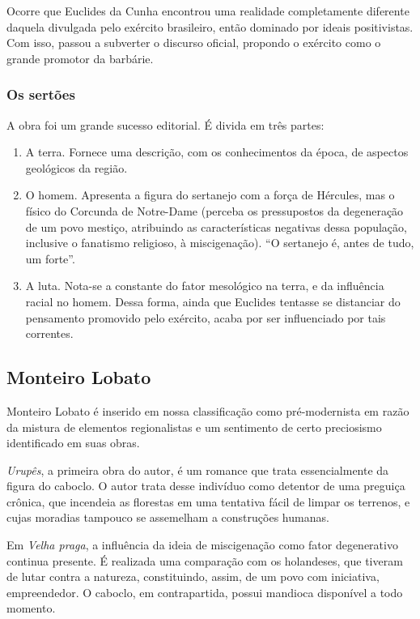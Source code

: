 Ocorre que Euclides da Cunha encontrou uma realidade completamente diferente daquela divulgada pelo exército brasileiro, então dominado por ideais positivistas. Com isso, passou a subverter o discurso oficial, propondo o exército como o grande promotor da barbárie.

\subsubsection{Os sertões}

A obra foi um grande sucesso editorial. É divida em três partes:

\begin{enumerate}
    \item A terra. Fornece uma descrição, com os conhecimentos da época, de aspectos geológicos da região.
    \item O homem. Apresenta a figura do sertanejo com a força de Hércules, mas o físico do Corcunda de Notre-Dame (perceba os pressupostos da degeneração de um povo mestiço, atribuindo as características negativas dessa população, inclusive o fanatismo religioso, à miscigenação). ``O sertanejo é, antes de tudo, um forte''.
    \item A luta. Nota-se a constante do fator mesológico na terra, e da influência racial no homem. Dessa forma, ainda que Euclides tentasse se distanciar do pensamento promovido pelo exército, acaba por ser influenciado por tais correntes.
\end{enumerate}

\subsection{Monteiro Lobato}

Monteiro Lobato é inserido em nossa classificação como pré-modernista em razão da mistura de elementos regionalistas e um sentimento de certo preciosismo identificado em suas obras.

\textit{Urupês}, a primeira obra do autor, é um romance que trata essencialmente da figura do caboclo. O autor trata desse indivíduo como detentor de uma preguiça crônica, que incendeia as florestas em uma tentativa fácil de limpar os terrenos, e cujas moradias tampouco se assemelham a construções humanas.

Em \textit{Velha praga}, a influência da ideia de miscigenação como fator degenerativo continua presente. É realizada uma comparação com os holandeses, que tiveram de lutar contra a natureza, constituindo, assim, de um povo com iniciativa, empreendedor. O caboclo, em contrapartida, possui mandioca disponível a todo momento.

